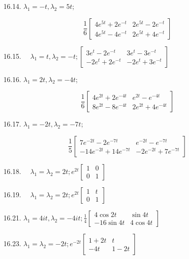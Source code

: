 \documentclass[10pt]{article}
\begin{document}
16.14. $\lambda_{1}=-t, \lambda_{2}=5 t$;

$$
\frac{1}{6}\left[\begin{array}{ll}
4 e^{5 t}+2 e^{-t} & 2 e^{5 t}-2 e^{-t} \\
4 e^{5 t}-4 e^{-t} & 2 e^{5 t}+4 e^{-t}
\end{array}\right]
$$

16.15. $\quad \lambda_{1}=t, \lambda_{2}=-t ;\left[\begin{array}{cc}3 e^{t}-2 e^{-t} & 3 e^{t}-3 e^{-t} \\ -2 e^{t}+2 e^{-t} & -2 e^{t}+3 e^{-t}\end{array}\right]$

16.16. $\lambda_{1}=2 t, \lambda_{2}=-4 t$;

$$
\frac{1}{6}\left[\begin{array}{cc}
4 e^{2 t}+2 e^{-4 t} & e^{2 t}-e^{-4 t} \\
8 e^{2 t}-8 e^{-4 t} & 2 e^{2 t}+4 e^{-4 t}
\end{array}\right]
$$

16.17. $\lambda_{1}=-2 t, \lambda_{2}=-7 t$;

$$
\frac{1}{5}\left[\begin{array}{cc}
7 e^{-2 t}-2 e^{-7 t} & e^{-2 t}-e^{-7 t} \\
-14 e^{-2 t}+14 e^{-7 t} & -2 e^{-2 t}+7 e^{-7 t}
\end{array}\right]
$$

16.18. $\quad \lambda_{1}=\lambda_{2}=2 t ; e^{2 t}\left[\begin{array}{ll}1 & 0 \\ 0 & 1\end{array}\right]$

16.19. $\quad \lambda_{1}=\lambda_{2}=2 t ; e^{2 t}\left[\begin{array}{ll}1 & t \\ 0 & 1\end{array}\right]$

16.21. $\lambda_{1}=4 i t, \lambda_{2}=-4 i t ; \frac{1}{4}\left[\begin{array}{cc}4 \cos 2 t & \sin 4 t \\ -16 \sin 4 t & 4 \cos 4 t\end{array}\right]$

16.23. $\lambda_{1}=\lambda_{2}=-2 t ; e^{-2 t}\left[\begin{array}{cc}1+2 t & t \\ -4 t & 1-2 t\end{array}\right]$
\end{document}
